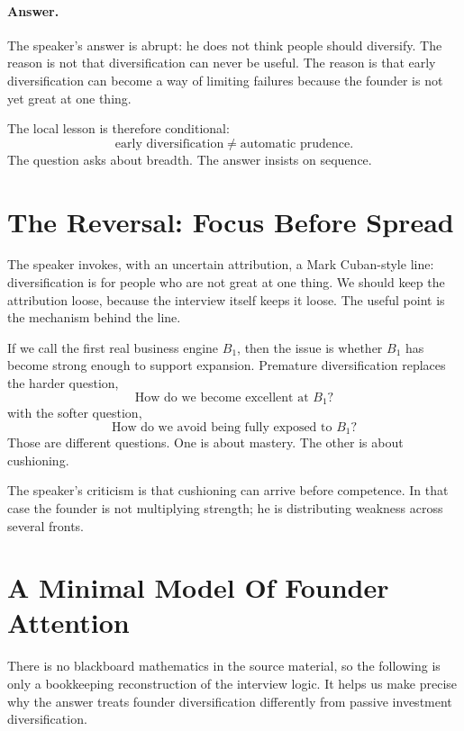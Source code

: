 \paragraph{Answer.}
The speaker's answer is abrupt: he does not think people should diversify. The reason is not that diversification can never be useful. The reason is that early diversification can become a way of limiting failures because the founder is not yet great at one thing.

The local lesson is therefore conditional:
\begin{equation}
\text{early diversification}
\neq
\text{automatic prudence}.
\end{equation}
The question asks about breadth. The answer insists on sequence.

\section{The Reversal: Focus Before Spread}

The speaker invokes, with an uncertain attribution, a Mark Cuban-style line: diversification is for people who are not great at one thing. We should keep the attribution loose, because the interview itself keeps it loose. The useful point is the mechanism behind the line.

If we call the first real business engine \(B_1\), then the issue is whether \(B_1\) has become strong enough to support expansion. Premature diversification replaces the harder question,
\begin{equation}
\text{How do we become excellent at } B_1?
\end{equation}
with the softer question,
\begin{equation}
\text{How do we avoid being fully exposed to } B_1?
\end{equation}
Those are different questions. One is about mastery. The other is about cushioning.

The speaker's criticism is that cushioning can arrive before competence. In that case the founder is not multiplying strength; he is distributing weakness across several fronts.

\section{A Minimal Model Of Founder Attention}

There is no blackboard mathematics in the source material, so the following is only a bookkeeping reconstruction of the interview logic. It helps us make precise why the answer treats founder diversification differently from passive investment diversification.

